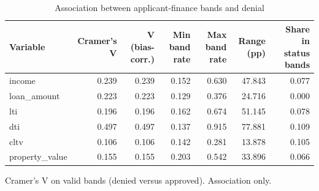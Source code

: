 \begin{table}[t]
\centering
\caption{Association between applicant-finance bands and denial}
\label{tab:table5_q3_association}
\small
\begin{tabular}{lrrrrrr}
\toprule
Variable & Cramer's V & V (bias-corr.) & Min band rate & Max band rate & Range (pp) & Share in status bands \\
\midrule
income & 0.239 & 0.239 & 0.152 & 0.630 & 47.843 & 0.077 \\
loan\_amount & 0.223 & 0.223 & 0.129 & 0.376 & 24.716 & 0.000 \\
lti & 0.196 & 0.196 & 0.162 & 0.674 & 51.145 & 0.078 \\
dti & 0.497 & 0.497 & 0.137 & 0.915 & 77.881 & 0.109 \\
cltv & 0.106 & 0.106 & 0.142 & 0.281 & 13.878 & 0.105 \\
property\_value & 0.155 & 0.155 & 0.203 & 0.542 & 33.896 & 0.066 \\
\bottomrule
\end{tabular}
\par\footnotesize Cramer's V on valid bands (denied versus approved). Association only.
\end{table}
